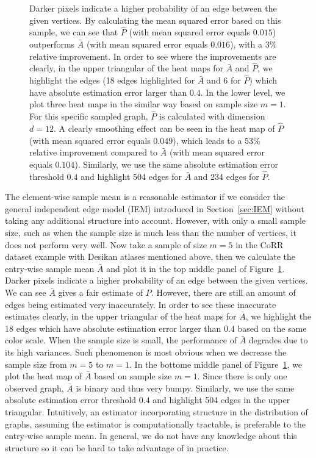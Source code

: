 \begin{figure}[!tbp]
{Darker pixels indicate a higher probability of an edge between the given vertices.
By calculating the mean squared error based on this sample, we can see that $\hat{P}$ (with mean squared error equals $0.015$) outperforms $\bar{A}$ (with mean squared error equals $0.016$), with a 3\% relative improvement.
In order to see where the improvements are clearly, in the upper triangular of the heat maps for $\bar{A}$ and $\hat{P}$, we highlight the edges (18 edges highlighted for $\bar{A}$ and 6 for $\hat{P}$) which have absolute estimation error larger than $0.4$.
In the lower level, we plot three heat maps in the similar way based on sample size $m = 1$. For this specific sampled graph, $\hat{P}$ is calculated with dimension $d = 12$. A clearly smoothing effect can be seen in the heat map of $\hat{P}$ (with mean squared error equals $0.049$), which leads to a 53\% relative improvement compared to $\bar{A}$ (with mean squared error equals $0.104$). Similarly, we use the same absolute estimation error threshold $0.4$ and highlight 504 edges for $\bar{A}$ and 234 edges for $\hat{P}$.}
\label{fig:Matrix_desikan_m5}
\end{figure}



The element-wise sample mean is a reasonable estimator if we consider the general independent edge model (IEM) \citep{bollobas2007phase} introduced in Section~\ref{sec:IEM} without taking any additional structure into account. 
However, with only a small sample size, such as when the sample size is much less than the number of vertices, it does not perform very well.
Now take a sample of size $m=5$ in the CoRR dataset example with Desikan atlases mentioned above, then we calculate the entry-wise sample mean $\bar{A}$ and plot it in the top middle panel of Figure~\ref{fig:Matrix_desikan_m5}. Darker pixels indicate a higher probability of an edge between the given vertices.
We can see $\bar{A}$ gives a fair estimate of $P$. However, there are still an amount of edges being estimated very inaccurately. In order to see these inaccurate estimates clearly, in the upper triangular of the heat maps for $\bar{A}$, we highlight the 18 edges which have absolute estimation error larger than $0.4$ based on the same color scale.
When the sample size is small, the performance of $\bar{A}$ degrades due to its high variances. Such phenomenon is most obvious when we decrease the sample size from $m = 5$ to $m = 1$.
In the bottome middle panel of Figure~\ref{fig:Matrix_desikan_m5}, we plot the heat map of $\bar{A}$ based on sample size $m = 1$. Since there is only one observed graph, $\bar{A}$ is binary and thus very bumpy. Similarly, we use the same absolute estimation error threshold $0.4$ and highlight 504 edges in the upper triangular.
Intuitively, an estimator incorporating structure in the distribution of graphs, assuming the estimator is computationally tractable, is preferable to the entry-wise sample mean. 
In general, we do not have any knowledge about this structure so it can be hard to take advantage of in practice.




